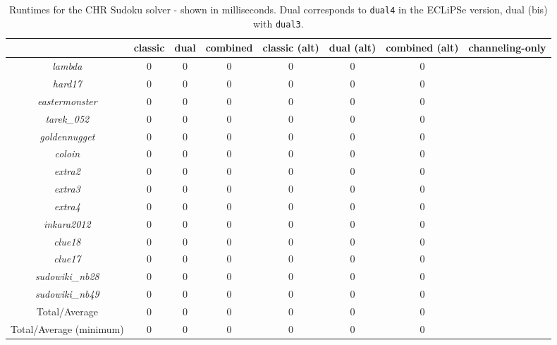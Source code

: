 \begin{table}[H]
\footnotesize
\centering
\bgroup
\def\arraystretch{1.3}
\begin{tabular}{cccc|ccc|c}
\multicolumn{1}{l}{} & classic & dual & combined & classic (alt) & dual (alt) & combined (alt) & channeling-only \\ \hline
\textit{lambda} & 0 & 0 & 0 & 0 & 0 & 0  \\
\textit{hard17} & 0 & 0 & 0 & 0 & 0 & 0  \\
\textit{eastermonster} & 0 & 0 & 0 & 0 & 0 & 0  \\
\textit{tarek\_052} & 0 & 0 & 0 & 0 & 0 & 0  \\
\textit{goldennugget} & 0 & 0 & 0 & 0 & 0 & 0  \\
\textit{coloin} & 0 & 0 & 0 & 0 & 0 & 0  \\
\textit{extra2} & 0 & 0 & 0 & 0 & 0 & 0  \\
\textit{extra3} & 0 & 0 & 0 & 0 & 0 & 0  \\
\textit{extra4} & 0 & 0 & 0 & 0 & 0 & 0  \\
\textit{inkara2012} & 0 & 0 & 0 & 0 & 0 & 0  \\
\textit{clue18} & 0 & 0 & 0 & 0 & 0 & 0  \\
\textit{clue17} & 0 & 0 & 0 & 0 & 0 & 0  \\
\textit{sudowiki\_nb28} & 0 & 0 & 0 & 0 & 0 & 0  \\
\textit{sudowiki\_nb49} & 0 & 0 & 0 & 0 & 0 & 0  \\\hline
Total/Average & 0 & 0 & 0 & 0 & 0 & 0  \\
Total/Average (minimum) & 0 & 0 & 0 & 0 & 0  & 0                     
\end{tabular}
\egroup
\caption{Runtimes for the CHR Sudoku solver - shown in milliseconds. Dual corresponds to \texttt{dual4} in the ECLiPSe version, dual (bis) with \texttt{dual3}.}
\label{tab:res4}
\end{table}